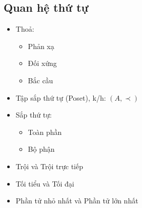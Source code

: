 \documentclass[11pt]{article}
\begin{document}
    \subsection{Quan hệ thứ tự}\label{quan-hux1ec7-thux1ee9-tux1ef1}

    \begin{itemize}
\item
  Thoả:

  \begin{itemize}
  \item
    Phản xạ
  \item
    Đối xứng
  \item
    Bắc cầu
  \end{itemize}
\item
  Tập sắp thứ tự (Poset), k/h: \((A, \prec )\)
\item
  Sắp thứ tự:

  \begin{itemize}
  \item
    Toàn phần
  \item
    Bộ phận
  \end{itemize}
\item
  Trội và Trội trực tiếp
\item
  Tối tiểu và Tối đại
\item
  Phần tử nhỏ nhất và Phần tử lớn nhất
\end{itemize}


    
    
    
\end{document}
